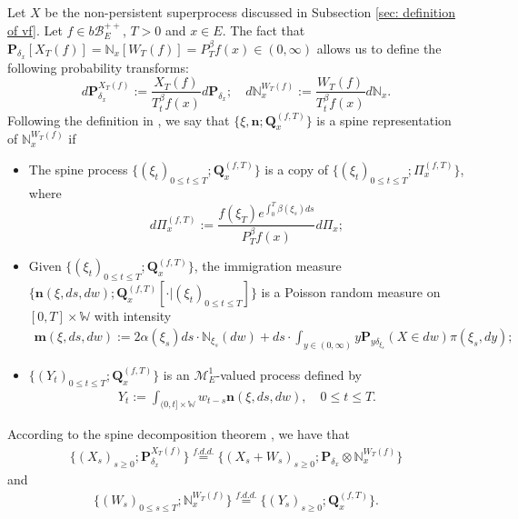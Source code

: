 \documentclass[12pt, a4paper]{amsart}
\theoremstyle{definition}
\numberwithin{equation}{section}
\begin{document}
\subsection{}
	Let $X$ be the non-persistent superprocess discussed in Subsection \ref{sec: definition of vf}.
	Let $f\in b\mathscr B_E^{++}$, $T >0$ and $x\in E$.
	The fact that $\mathbf P_{\delta_x}[X_T(f)] = \mathbb N_x[W_T(f)] = P^\beta_T f(x) \in (0,\infty)$ allows us to define the following probability transforms:
\begin{equation}
	d\mathbf P_{\delta_x}^{X_T(f)}
	:= \frac{X_T(f)}{T_t^\beta f(x)} d\mathbf P_{\delta_x};
	\quad d\mathbb N_x^{W_T(f)}
	:=  \frac{W_T(f)}{T_t^\beta f(x)} d\mathbb N_x.
\end{equation}
	Following the definition in \cite{RenSongSun2017Spine}, we say that $\{\xi, \mathbf n;\mathbf Q_{x}^{(f,T)}\}$ is a spine representation of $\mathbb N_x^{W_T(f)}$ if
\begin{itemize}
\item
    The spine process $\{(\xi_t)_{0\leq t\leq T}; \mathbf Q^{(f,T)}_x\}$ is a copy of $\{(\xi_t)_{0\leq t\leq T}; \Pi^{(f,T)}_{x}\}$,
    where
\begin{equation}
    d\Pi_x^{(f,T)} := \frac{f(\xi_T)e^{\int_0^T \beta(\xi_s)ds}}{P^\beta_T f(x)} d \Pi_x;
\end{equation}
\item
    Given $\{(\xi_t)_{0\leq t\leq T}; \mathbf Q^{(f,T)}_x\}$, the immigration measure $\{\mathbf n(\xi,ds,dw); \mathbf Q^{(f,T)}_x[\cdot |(\xi_t)_{0\leq t\leq T}]\}$ is a Poisson random measure on $[0,T] \times \mathbb W$ with intensity
\begin{align}
    \mathbf m(\xi,ds,dw)
    := 2 \alpha(\xi_s) ds \cdot \mathbb N_{\xi_s}(dw) + ds \cdot \int_{y\in (0,\infty)} y \mathbf P_{y\delta_{\xi_s}}(X\in dw) \pi(\xi_s,dy);
\end{align}
\item
    $\{(Y_t)_{0\leq t\leq T}; \mathbf Q^{(f,T)}_x\}$ is an $\mathcal M^1_E$-valued process defined by
\begin{align}
    Y_t
    := \int_{(0,t] \times \mathbb W} w_{t-s} \mathbf n(\xi,ds,dw),
    \quad 0 \leq t\leq T.
\end{align}
\end{itemize}
	According to the spine decomposition theorem \cite{RenSongSun2017Spine}, we have that
\begin{align}
\label{eq: Spine decomposition 1}
	\{(X_s)_{s \geq 0};\mathbf P_{\delta_x}^{X_T(f)}\}
	\overset{f.d.d.}{=} \{(X_s + W_s)_{s \geq 0};\mathbf P_{\delta_x} \otimes \mathbb N_x^{W_T(f)} \}
\end{align}
    and
\begin{align}
\label{eq: Spine decomposition 2}
    \{(W_s)_{0\leq s\leq T};\mathbb N_x^{W_T(f)}\}
    \overset{f.d.d.}{=} \{(Y_s)_{s \geq 0};\mathbf Q_x^{(f,T)}\}.
\end{align}
\end{document}

